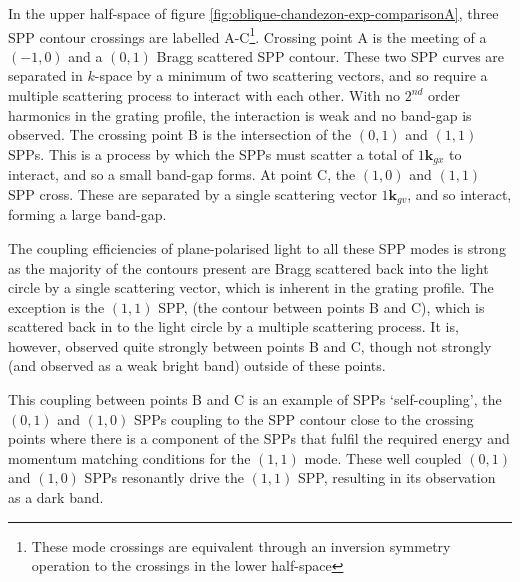 In the upper half-space of figure \ref{fig:oblique-chandezon-exp-comparisonA}, three SPP contour crossings are labelled A-C\footnote{These mode crossings are equivalent through an inversion symmetry operation to the crossings in the lower half-space}. Crossing point A is the meeting of a $(-1,0)$ and a $(0,1)$ Bragg scattered SPP contour. These two SPP curves are separated in  $k$-space by a minimum of two scattering vectors, and so require a multiple scattering process to interact with each other. With no $2^{nd}$ order harmonics in the grating profile, the interaction is weak and no band-gap is observed. The crossing point B is the intersection of the $(0,1)$ and $(1,1)$ SPPs. This is a process by which the SPPs must scatter a total of $1\mathbf{k}_{gx}$ to interact, and so a small band-gap forms. At point C, the $(1,0)$ and $(1,1)$ SPP cross. These are separated by a single scattering vector $1\mathbf{k}_{gv}$, and so interact, forming a large band-gap.

The coupling efficiencies of plane-polarised light to all these SPP modes is strong as the majority of the contours present are Bragg scattered back into the light circle by a single scattering vector, which is inherent in the grating profile. The exception is the $(1,1)$ SPP, (the contour between points B and C), which is scattered back in to the light circle by a multiple scattering process. It is, however, observed quite strongly between points B and C, though not strongly (and observed as a weak bright band) outside of these points. 

This coupling between points B and C is an example of SPPs `self-coupling', the $(0,1)$ and $(1,0)$ SPPs coupling to the SPP contour close to the crossing points where there is a component of the SPPs that fulfil the required energy and momentum matching conditions for the $(1,1)$ mode. These well coupled $(0,1)$ and $(1,0)$ SPPs resonantly drive the $(1,1)$ SPP, resulting in its observation as a dark band.

